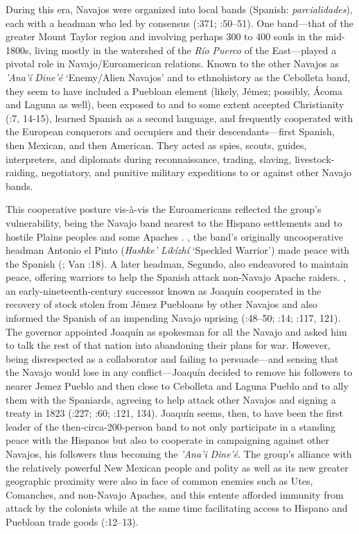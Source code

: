   During this era, Navajos were organized into local bands (Spanish: \textit{parcialidades}), each with a headman who led by consensus (\citealt{Young1961}:371; \citealt{Shepardson1963}:50–51).  One band—that of the greater Mount Taylor region and involving perhaps 300 to 400 souls in the mid-1800s, living mostly in the watershed of the \textit{Río} \textit{Puerco} of the East—played a pivotal role in Navajo/Euroamerican relations.  Known to the other Navajos as \textit{’Ana’í} \textit{Dine’é} ‘Enemy/Alien Navajos’ and to ethnohistory as the Cebolleta band, they seem to have included a Puebloan element (likely, Jémez; possibly, Ácoma and Laguna as well), been exposed to and to some extent accepted Christianity (\citealt{Wilken1955}:7, 14-15), learned Spanish as a second language, and frequently cooperated with the European conquerors and occupiers and their descendants—first Spanish, then Mexican, and then American.  They acted as spies, scouts, guides, interpreters, and diplomats during reconnaissance, trading, slaving, livestock-raiding, negotiatory, and punitive military expeditions to or against other Navajo bands.  

This cooperative posture vis-à-vis the Euroamericans reflected the group’s vulnerability, being the Navajo band nearest to the Hispano settlements and to hostile Plains peoples and some Apaches \citep[141]{Brugge1985}.  \citealt{In1788}, the band’s originally uncooperative headman Antonio el Pinto (\textit{Hashke’} \textit{Likízhí} ‘Speckled Warrior’) made peace with the Spanish (\citealt{Carey2014}; Van \citealt{Valkenburgh1999}:18).  A later headman, Segundo, also endeavored to maintain peace, offering warriors to help the Spanish attack non-Navajo Apache raiders.  \citealt{In1818}, an early-nineteenth-century successor known as Joaquín cooperated in the recovery of stock stolen from Jémez Puebloans by other Navajos and also informed the Spanish of an impending Navajo uprising (\citealt{McNitt1972}:48–50; \citealt{Correll1979}:14; \citealt{Acrey1988}:117, 121).  The governor appointed Joaquín as spokesman for all the Navajo and asked him to talk the rest of that nation into abandoning their plans for war.  However, being disrespected as a collaborator and failing to persuade—and sensing that the Navajo would lose in any conflict—Joaquín decided to remove his followers to nearer Jemez Pueblo and then close to Cebolleta and Laguna Pueblo and to ally them with the Spaniards, agreeing to help attack other Navajos and signing a treaty in 1823 (\citealt{Reeve1971b}:227; \citealt{Julyan1998}:60; \citealt{Acrey1988}:121, 134).  Joaquín seems, then, to have been the first leader of the then-circa-200-person band to not only participate in a standing peace with the Hispanos but also to cooperate in campaigning against other Navajos, his followers thus becoming the \textit{’Ana’i} \textit{Dine’é}.  The group’s alliance with the relatively powerful New Mexican people and polity as well as its new greater geographic proximity were also in face of common enemies such as Utes, Comanches, and non-Navajo Apaches, and this entente afforded immunity from attack by the colonists while at the same time facilitating access to Hispano and Puebloan trade goods (\citealt{Trafzer1982}:12–13).  

